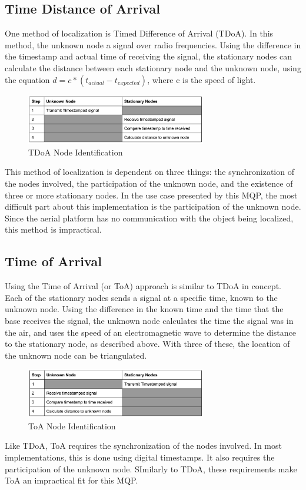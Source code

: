 \subsection{Time Distance of Arrival}
One method of localization is Timed Difference of Arrival (TDoA). In this method, the unknown node a signal over radio frequencies. Using the difference in the timestamp and actual time of receiving the signal, the stationary nodes can calculate the distance between each stationary node and the unknown node, using the equation \( d = c*(t_{actual} - t_{expected}) \), where c is the speed of light.
\begin{figure}[ht]
\centering
\includegraphics[width=0.70\textwidth]{img/tdoa_node_table.png}
\caption{TDoA Node Identification}
\label{fig:tdoa_node_identification}
\end{figure}\par
This method of localization is dependent on three things: the synchronization of the nodes involved, the participation of the unknown node, and the existence of three or more stationary nodes. In the use case presented by this MQP, the most difficult part about this implementation is the participation of the unknown node. Since the aerial platform has no communication with the object being localized, this method is impractical.

\subsection{Time of Arrival}
Using the Time of Arrival (or ToA) approach is similar to TDoA in concept. Each of the stationary nodes sends a signal at a specific time, known to the unknown node. Using the difference in the known time and the time that the base receives the signal, the unknown node calculates the time the signal was in the air, and uses the speed of an electromagnetic wave to determine the distance to the stationary node, as described above. With three of these, the location of the unknown node can be triangulated.
\begin{figure}[ht]
\centering
\includegraphics[width=0.70\textwidth]{img/toa_node_table.png}
\caption{ToA Node Identification}
\label{fig:toa_node_identification}
\end{figure}\par
Like TDoA, ToA requires the synchronization of the nodes involved. In most implementations, this is done using digital timestamps. It also requires the participation of the unknown node. SImilarly to TDoA, these requirements make ToA an impractical fit for this MQP.

